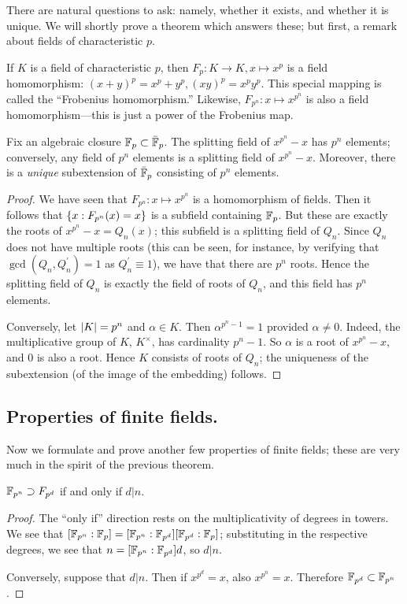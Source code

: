 There are natural questions to ask: namely, whether it exists, and whether it is unique. 
We will shortly prove a theorem which answers these; but first, a remark about fields of characteristic $p$.

\begin{rmk}
If $K$ is a field of characteristic $p$, then $F_p: K \to K, x \mapsto x^p$ is a field homomorphism: $(x + y)^p = x^p + y^p, (xy)^p = x^p y^p$. 
This special mapping is called the ``Frobenius homomorphism.'' 
Likewise, $F_{p^n}: x \mapsto x^{p^n}$ is also a field homomorphism---this is just a power of the Frobenius map.
\end{rmk}

\begin{thm}
Fix an algebraic closure $\mathbb{F}_p \subset \bar{\mathbb{F}}_p$. 
The splitting field of $x^{p^n} - x$ has $p^n$ elements; conversely, any field of $p^n$ elements is a splitting field of $x^{p^n} - x$. 
Moreover, there is a \emph{unique} subextension of $\bar{\mathbb{F}}_p$ consisting of $p^n$ elements.
\end{thm}
\begin{proof}
We have seen that $F_{p^n}: x \mapsto x^{p^n}$ is a homomorphism of fields. 
Then it follows that $\left\{x : F_{p^n}(x) = x\right\}$ is a subfield containing $\mathbb{F}_p$. 
But these are exactly the roots of $x^{p^n} - x = Q_n(x)$; this subfield is a splitting field of $Q_n$. 
Since $Q_n$ does not have multiple roots (this can be seen, for instance, by verifying that $\gcd(Q_n, Q_n^\prime) = 1$ as $Q_n^\prime \equiv 1$), we have that there are $p^n$ roots. 
Hence the splitting field of $Q_n$ is exactly the field of roots of $Q_n$, and this field has $p^n$ elements.

Conversely, let $\left|K\right| = p^n$ and $\alpha \in K$. 
Then $\alpha^{p^n - 1} = 1$ provided $\alpha \neq 0$. 
Indeed, the multiplicative group of $K$, $K^\times$, has cardinality $p^n - 1$. 
So $\alpha$ is a root of $x^{p^n} - x$, and $0$ is also a root. 
Hence $K$ consists of roots of $Q_n$; the uniqueness of the subextension (of the image of the embedding) follows.
\end{proof}

\subsection{Properties of finite fields.}
Now we formulate and prove another few properties of finite fields; these are very much in the spirit of the previous theorem.

\begin{thm}
$\mathbb{F}_{p^n} \supset F_{p^d}$ if and only if $d|n$.
\end{thm}
\begin{proof}
The ``only if'' direction rests on the multiplicativity of degrees in towers. 
We see that $[\mathbb{F}_{p^n} : \mathbb{F}_{p}] = [\mathbb{F}_{p^n} : \mathbb{F}_{p^d}] [\mathbb{F}_{p^d} : \mathbb{F}_{p}]$; substituting in the respective degrees, we see that $n = [\mathbb{F}_{p^n} : \mathbb{F}_{p^d}] d$, so $d|n$.

Conversely, suppose that $d|n$. 
Then if $x^{p^d} = x$, also $x^{p^n} = x$. 
Therefore $\mathbb{F}_{p^d} \subset \mathbb{F}_{p^n}$.
\end{proof}

